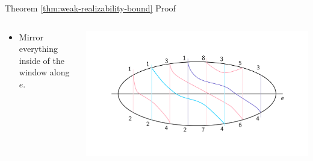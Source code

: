 \documentclass[10pt,aspectratio=169]{beamer}
\theoremstyle{plain}
\begin{document}
\begin{frame}{Theorem \ref{thm:weak-realizability-bound} Proof}
    \begin{columns}
    \begin{column}{0.35\textwidth}
        \begin{itemize}
            \item Mirror everything inside of the window along \(e\).
        \end{itemize}
    \end{column}
    \begin{column}{0.65\textwidth}
        \begin{center}
            \includegraphics[width=\textwidth]{images/figure-8.pdf}
        \end{center}
    \end{column}
    \end{columns}
\end{frame}
\end{document}
